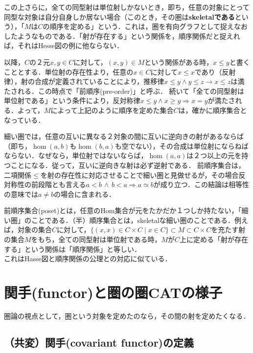 \documentclass[uplatex, 12pt, dvipdfmx]{jsreport}
\begin{document}
この上さらに，全ての同型射は単位射しかないとき，即ち，任意の対象にとって同型な対象は自分自身しか居ない場合（このとき，その圏は\textbf{skeletalである}という），「$M$は$C$の順序を定める」という．これは，圏を有向グラフとして捉えなおしたようなものである．「射が存在する」という関係を，順序関係だと捉えれば，それはHesse図の例に他ならない．

以降，$C$の２元$x,y\in C$に対して，$(x,y)\in M$という関係がある時，$x\le y$と書くこととする．単位射の存在性より，任意の$x\in C$に対して$x\le x$であり（反射律），射の合成が定義されていることにより，推移律$x\le y \wedge y\le z \rightarrow x\le z$は満たされる．この時点で「前順序(pre-order)」と呼ぶ．
続いて「全ての同型射は単位射である」という条件により，反対称律$x\le y \wedge x\ge y \Rightarrow x=y$が満たされる．よって，$M$によって上記のように順序を定めた集合$C$は，確かに順序集合となっている．

\begin{remark}\rm{}
    細い圏では，任意の互いに異なる２対象の間に互いに逆向きの射があるならば（即ち，$\hom(a,b)$も$\hom(b,a)$も空でない），その合成は単位射にならねばならない．なぜなら，単位射ではないならば，$\hom(a,a)$は２つ以上の元を持つことになる．従って，互いに逆向きな射は必ず逆射である．
    前順序集合は，二項関係$\le$を射の存在性に対応させることで細い圏と見做せるが，その場合反対称性の前段階とも言える$a<b\,\wedge\,b<a\Rightarrow a\simeq b$が成り立つ．この結論は相等性の意味では$a\neq b$の場合に含まれる．
\end{remark}

\begin{screen}
    前順序集合(poset)とは，任意のHom集合が元をたかだか１つしか持たない，「細い圏」のことである．（半）順序集合とは，skeletalな細い圏のことである．例えば，対象の集合$C$に対して，$\{ (x,x) \in C\times C \mid x\in C \}\subset M\subset C\times C$を充たす射の集合$M$をもち，全ての同型射は単位射である時，$M$が$C$上に定める「射が存在する」という関係は「順序関係」と等しい．\\
    これはHasse図と順序関係の公理との対応に似ている．
\end{screen}

\clearpage
\chapter{関手(functor)と圏の圏\textbf{CAT}の様子}

圏論の視点として，圏という対象を定めたのなら，その間の射を定めたくなる．

\section{（共変）関手(covariant functor)の定義}
\end{document}
